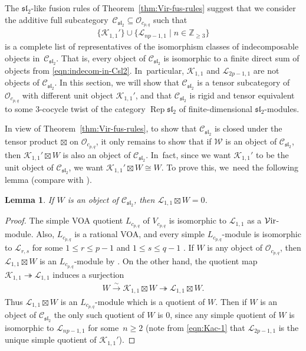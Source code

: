 \documentclass[pdftex]{sigma}
\numberwithin{equation}{section}
\newtheorem{Lemma}[Theorem]{Lemma}
\theoremstyle{definition}
\begin{document}
The $\mathfrak{sl}_2$-like fusion rules of Theorem~\ref{thm:Vir-fus-rules} suggest that we consider the additive full subcategory~${\mathcal{C}_{\mathfrak{sl}_2}\subseteq\mathcal{O}_{c_{p,q}}}$ such that
\begin{gather}\label{eqn:indecom-in-Csl2}
\lbrace\mathcal{K}_{1,1}'\rbrace\cup\lbrace\mathcal{L}_{np-1,1}\mid n\in\mathbb{Z}_{\geq 3}\rbrace
\end{gather}
is a complete list of representatives of the isomorphism classes of indecomposable objects in~$\mathcal{C}_{\mathfrak{sl}_2}$. That is, every object of $\mathcal{C}_{\mathfrak{sl}_2}$ is isomorphic to a finite direct sum of objects from \eqref{eqn:indecom-in-Csl2}. In~particular, $\mathcal{K}_{1,1}$ and $\mathcal{L}_{2p-1,1}$ are not objects of $\mathcal{C}_{\mathfrak{sl}_2}$. In this section, we will show that $\mathcal{C}_{\mathfrak{sl}_2}$ is a tensor subcategory of $\mathcal{O}_{c_{p,q}}$ with different unit object $\mathcal{K}_{1,1}'$, and that $\mathcal{C}_{\mathfrak{sl}_2}$ is rigid and tensor equivalent to some $3$-cocycle twist of the category $\operatorname{Rep} \mathfrak{sl}_2$ of finite-dimensional $\mathfrak{sl}_2$-modules.

In view of Theorem~\ref{thm:Vir-fus-rules}, to show that $\mathcal{C}_{\mathfrak{sl}_2}$ is closed under the tensor product $\boxtimes$ on $\mathcal{O}_{c_{p,q}}$, it only remains to show that if $\mathcal{W}$ is an object of $\mathcal{C}_{\mathfrak{sl}_2}$, then $\mathcal{K}_{1,1}'\boxtimes W$ is also an object of $\mathcal{C}_{\mathfrak{sl}_2}$. In~fact, since we want $\mathcal{K}_{1,1}'$ to be the unit object of $\mathcal{C}_{\mathfrak{sl}_2}$, we want $\mathcal{K}_{1,1}'\boxtimes W\cong W$. To prove this, we~need the following lemma (compare with \cite[Lemma~2.19]{MY-univ-sl2}).
\begin{Lemma}\label{lem:L11xW}
If $W$ is an object of $\mathcal{C}_{\mathfrak{sl}_2}$, then $\mathcal{L}_{1,1}\boxtimes W=0$.
\end{Lemma}
\begin{proof}
The simple VOA quotient $L_{c_{p,q}}$ of $V_{c_{p,q}}$ is isomorphic to $\mathcal{L}_{1,1}$ as a $\mathcal{V}{\rm ir}$-module. Also, $L_{c_{p,q}}$ is a rational VOA, and every simple $L_{c_{p,q}}$-module is isomorphic to $\mathcal{L}_{r,s}$ for some $1\leq r\leq p-1$ and $1\leq s\leq q-1$ \cite{Wang}.
If $W$ is any object of $\mathcal{O}_{c_{p,q}}$, then $\mathcal{L}_{1,1}\boxtimes W$ is an $L_{c_{p,q}}$-module by \cite[Lemma 5.11]{MS-cpq-Vir}. On the other hand, the quotient map $\mathcal{K}_{1,1}\twoheadrightarrow\mathcal{L}_{1,1}$ induces a surjection
\begin{gather*}
W\xrightarrow{\sim}\mathcal{K}_{1,1}\boxtimes W\twoheadrightarrow\mathcal{L}_{1,1}\boxtimes W.
\end{gather*}
Thus $\mathcal{L}_{1,1}\boxtimes W$ is an $L_{c_{p,q}}$-module which is a quotient of $W$. Then if $W$ is an object of $\mathcal{C}_{\mathfrak{sl}_2}$ the only such quotient of $W$ is $0$, since any simple quotient of $W$ is isomorphic to $\mathcal{L}_{np-1,1}$ for some~${n\geq 2}$ (note from \eqref{eqn:Kac-1} that $\mathcal{L}_{2p-1,1}$ is the unique simple quotient of $\mathcal{K}_{1,1}'$).
\end{proof}
\end{document}
